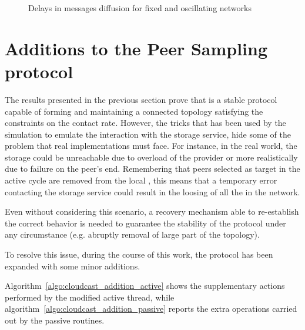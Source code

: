 \begin{figure}[H]
  \centering
  \caption{Delays in messages diffusion for fixed and oscillating networks}
  \label{fig:cloudcast-sim-globa-delay}
\end{figure}

\section{Additions to the Peer Sampling protocol}
\label{sec:cloudcast-additions}
The results presented in the previous section prove that
\cloudcast is a stable protocol capable of forming and maintaining a
connected topology satisfying the constraints on the \cloud contact
rate. However,
the tricks that has been used by the simulation to emulate the interaction
with the storage service, hide some of the problem that real
implementations must face. For instance, in the real world, the
\cloud storage could be unreachable due to overload of the provider
or more realistically due to failure on the peer's end. Remembering
that peers selected as target in the active cycle are removed from the
local \view, this means that a temporary error contacting the
storage service could result in the loosing of all the
\cloud \descriptors in the network.

Even without considering this scenario, a recovery mechanism able to
re-establish the correct behavior is needed to guarantee the stability
of the protocol under any circumstance (e.g. abruptly removal of large
part of the topology).

To resolve this issue, during the course of this work, the
\peersampling protocol has been expanded with some minor additions.



Algorithm~\ref{algo:cloudcast_addition_active} shows the
supplementary actions performed by the modified \cyclon active thread,
while algorithm~\ref{algo:cloudcast_addition_passive} reports
the extra operations carried out by the passive routines.

